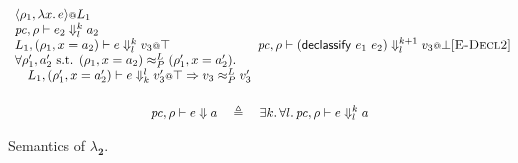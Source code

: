 \documentclass{article}
\makeatletter
\theoremstyle{definition}
\newcommand{\at}{\ensuremath{{\scriptstyle{@}}}}
\newcommand{\pc}{\ensuremath{{\mathit{pc}}}}
\makeatother
\begin{document}
\begin{figure}[ht]
\begin{gather*}
{{\begin{array}{l}
          \langle{\rho_1, \lambda{x}.\, e\rangle} \at L_1
          \\
          \pc, \rho |- e_2 \Downarrow^{k}_{l} a_2
          \\
          L_1, (\rho_1, x = a_2) |- e \Downarrow^{k}_{l} v_3 \at \top
          \\
          \forall{\rho_1', a_2' \text{ s.t. }
            (\rho_1, x = a_2) \approx^{L}_{P} (\rho_1', x = a_2')}.
          \\\quad
          L_1, (\rho_1', x = a_2') |- e \Downarrow^{l}_{k} v_3' \at \top =>
          v_3 \approx^{L}_{P} v_3'
        \end{array}}
    }{
      \pc, \rho |- (\mathsf{declassify}\ e_1\ e_2) \Downarrow^{k+1}_{l}
      v_3 \at \bot
    }[\textsc{E-Decl2}]
    \\[3ex]
    \pc, \rho |- e \Downarrow a
    \quad \triangleq \quad
    \exists{k}.\, \forall{l}.\,
    \pc, \rho |- e \Downarrow^{k}_{l} a
  \end{gather*}
  \caption{Semantics of $\lambda_{\mathbf{2}}$.}
  \label{fig:semantics}
\end{figure}
\end{document}
